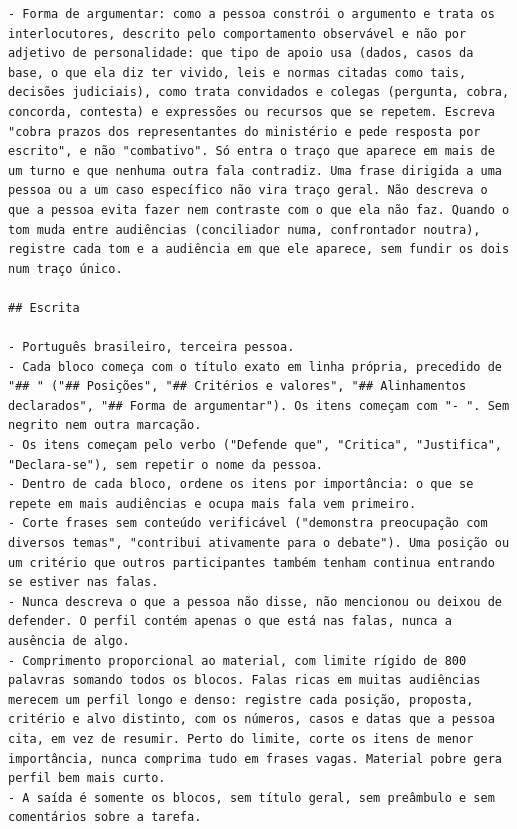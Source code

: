 \begin{lstlisting}[basicstyle=\footnotesize\rmfamily,breakindent=0.8em,breakatwhitespace=true,
caption={\textit{System prompt} da geração dos perfis.},label=lst:prompt-sistema]
- Forma de argumentar: como a pessoa constrói o argumento e trata os interlocutores, descrito pelo comportamento observável e não por adjetivo de personalidade: que tipo de apoio usa (dados, casos da base, o que ela diz ter vivido, leis e normas citadas como tais, decisões judiciais), como trata convidados e colegas (pergunta, cobra, concorda, contesta) e expressões ou recursos que se repetem. Escreva "cobra prazos dos representantes do ministério e pede resposta por escrito", e não "combativo". Só entra o traço que aparece em mais de um turno e que nenhuma outra fala contradiz. Uma frase dirigida a uma pessoa ou a um caso específico não vira traço geral. Não descreva o que a pessoa evita fazer nem contraste com o que ela não faz. Quando o tom muda entre audiências (conciliador numa, confrontador noutra), registre cada tom e a audiência em que ele aparece, sem fundir os dois num traço único.

## Escrita

- Português brasileiro, terceira pessoa.
- Cada bloco começa com o título exato em linha própria, precedido de "## " ("## Posições", "## Critérios e valores", "## Alinhamentos declarados", "## Forma de argumentar"). Os itens começam com "- ". Sem negrito nem outra marcação.
- Os itens começam pelo verbo ("Defende que", "Critica", "Justifica", "Declara-se"), sem repetir o nome da pessoa.
- Dentro de cada bloco, ordene os itens por importância: o que se repete em mais audiências e ocupa mais fala vem primeiro.
- Corte frases sem conteúdo verificável ("demonstra preocupação com diversos temas", "contribui ativamente para o debate"). Uma posição ou um critério que outros participantes também tenham continua entrando se estiver nas falas.
- Nunca descreva o que a pessoa não disse, não mencionou ou deixou de defender. O perfil contém apenas o que está nas falas, nunca a ausência de algo.
- Comprimento proporcional ao material, com limite rígido de 800 palavras somando todos os blocos. Falas ricas em muitas audiências merecem um perfil longo e denso: registre cada posição, proposta, critério e alvo distinto, com os números, casos e datas que a pessoa cita, em vez de resumir. Perto do limite, corte os itens de menor importância, nunca comprima tudo em frases vagas. Material pobre gera perfil bem mais curto.
- A saída é somente os blocos, sem título geral, sem preâmbulo e sem comentários sobre a tarefa.
\end{lstlisting}

